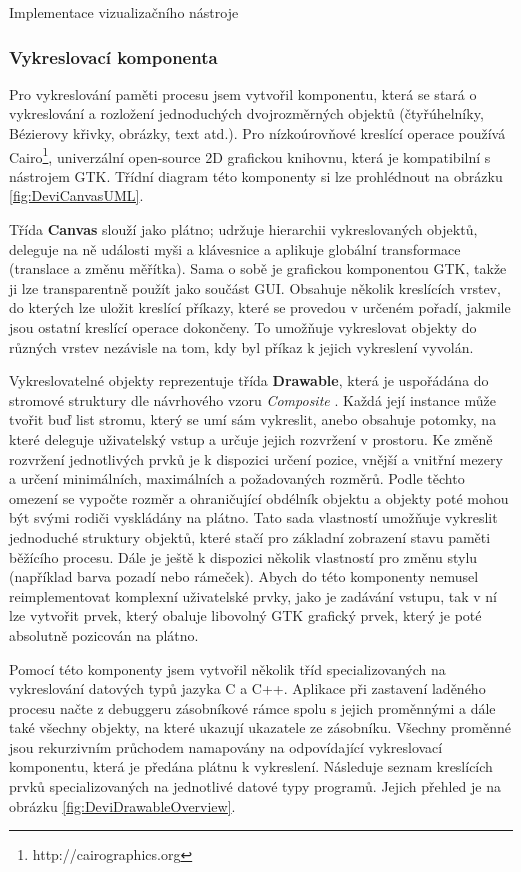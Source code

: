 \documentclass[czech,bachelor,male,python,dept460,hidelinks]{diploma}						%
\newcommand{\parspace}[1][]{
	\ifthenelse{\isempty{#1}}{\vspace{5mm}}{\vspace{#1}}
	\par
}
\begin{document}
\begin{section}{Implementace vizualizačního nástroje}
	\subsubsection{Vykreslovací komponenta}
	Pro vykreslování paměti procesu jsem vytvořil komponentu, která se stará o vykreslování a rozložení jednoduchých dvojrozměrných objektů
	(čtyřúhelníky, Bézierovy křivky, obrázky, text atd.). Pro nízkoúrovňové kreslící operace používá Cairo\footnote{http://cairographics.org}, univerzální
	open-source 2D grafickou knihovnu, která je kompatibilní s nástrojem GTK. Třídní diagram této komponenty si lze prohlédnout na obrázku
	\ref{fig:DeviCanvasUML}.
	
	
	Třída \textbf{Canvas} slouží jako plátno; udržuje hierarchii vykreslovaných objektů, deleguje na ně události myši a klávesnice a aplikuje globální transformace
	(translace a změnu měřítka). Sama o sobě je grafickou komponentou GTK, takže ji lze transparentně použít jako součást GUI.
	Obsahuje několik kreslících vrstev, do kterých lze uložit kreslící příkazy, které se provedou v určeném pořadí, jakmile jsou ostatní kreslící operace dokončeny.
	To umožňuje vykreslovat objekty do různých vrstev nezávisle na tom, kdy byl příkaz k jejich vykreslení vyvolán.
	
	\parspace Vykreslovatelné objekty reprezentuje třída \textbf{Drawable}, která je uspořádána do stromové struktury dle návrhového vzoru
	\textit{Composite} \cite[183]{gof}. Každá její instance může tvořit buď list stromu, který se umí sám vykreslit, anebo obsahuje potomky, na které deleguje
	uživatelský vstup a určuje jejich rozvržení v prostoru. Ke změně rozvržení jednotlivých prvků je k dispozici určení pozice, vnější a vnitřní mezery
	a určení minimálních, maximálních a požadovaných rozměrů. Podle těchto omezení se vypočte rozměr a ohraničující obdélník objektu a objekty poté mohou být
	svými rodiči vyskládány na plátno.
	Tato sada vlastností umožňuje vykreslit jednoduché struktury objektů, které stačí pro základní zobrazení stavu paměti běžícího procesu.
	Dále je ještě k dispozici několik vlastností pro změnu stylu (například barva pozadí nebo rámeček). Abych do této komponenty
	nemusel reimplementovat komplexní uživatelské prvky, jako je zadávání vstupu, tak v ní lze vytvořit prvek, který obaluje libovolný GTK grafický prvek,
	který je poté absolutně pozicován na plátno.
	
	\parspace Pomocí této komponenty jsem vytvořil několik tříd specializovaných na vykreslování datových typů jazyka C a C++. Aplikace při zastavení laděného
	procesu načte z debuggeru zásobníkové rámce spolu s jejich proměnnými a dále také všechny objekty, na které ukazují ukazatele ze zásobníku.
	Všechny proměnné jsou rekurzivním průchodem namapovány na odpovídající vykreslovací komponentu, která je předána plátnu k vykreslení.
	Následuje seznam kreslících prvků specializovaných na jednotlivé datové typy programů. Jejich přehled je na obrázku \ref{fig:DeviDrawableOverview}.
	

\end{section}
\end{document}

